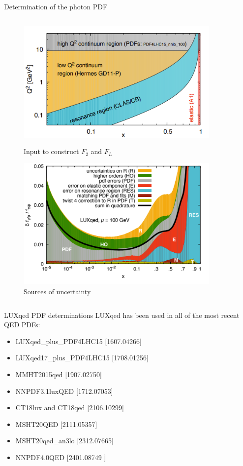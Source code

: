 \begin{frame}{Determination of the photon PDF}
\begin{columns}[T]
    \begin{column}{0.39\textwidth}
      \vspace*{-2.5em}
      \begin{figure}
        \includegraphics[width=0.89\textwidth]{figures/dataluxqed.png}
        \caption*{Input to construct $F_2$ and $F_L$}
        \includegraphics[width=0.89\textwidth]{figures/luxQED_uncs.png}
        \caption*{Sources of uncertainty}
      \end{figure}
    \end{column}
  \end{columns}
\end{frame}


\begin{frame}{LUXqed PDF determinations}
  LUXqed has been used in all of the most recent QED PDFs:
  \begin{itemize}
      \item LUXqed\_plus\_PDF4LHC15 {\color{gray}\small [1607.04266]}
      \item LUXqed17\_plus\_PDF4LHC15 {\color{gray}\small [1708.01256]}
      \item MMHT2015qed {\color{gray}\small [1907.02750]}
      \item NNPDF3.1luxQED {\color{gray}\small [1712.07053]}
      \item CT18lux and CT18qed {\color{gray}\small [2106.10299]}
      \item MSHT20QED {\color{gray}\small [2111.05357]}
      \item MSHT20qed\_an3lo {\color{gray}\small [2312.07665]}
      \item NNPDF4.0QED {\color{gray}\small [2401.08749 ]}
  \end{itemize}
\end{frame}


